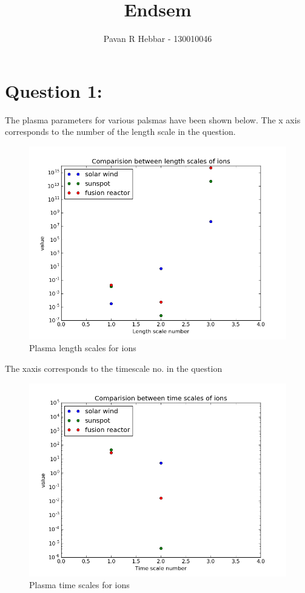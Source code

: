 \documentclass[11pt, a4paper]{article}
\title{\textbf{Endsem}}
\author{Pavan R Hebbar - 130010046}
\begin{document}
\maketitle
\newpage
\section{Question 1:}

The plasma parameters for various palsmas have been shown below. The x axis corresponds to the number 
of the length scale in the question. 
\begin{figure}[H]
 \centering
 \includegraphics[scale = 0.6]{ques1_len.png}
 \caption{Plasma length scales for ions}
\end{figure}

The xaxis corresponds to the timescale no. in the question
\begin{figure}[H]
 \centering
 \includegraphics[scale = 0.6]{ques1_time.png}
 \caption{Plasma time scales for ions}
\end{figure}
\end{document}
